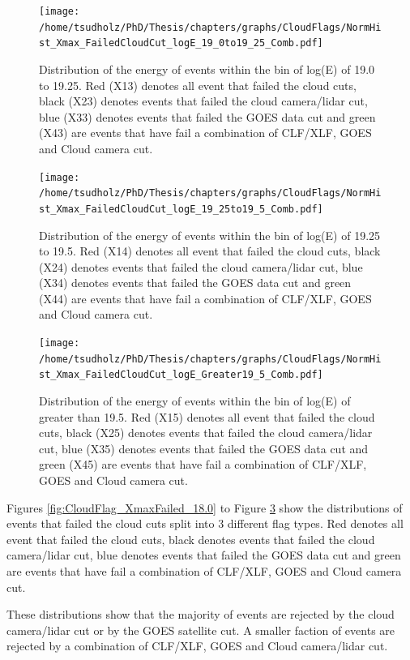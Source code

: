 \begin{figure}[!p]
\centering
\texttt{[image: /home/tsudholz/PhD/Thesis/chapters/graphs/CloudFlags/NormHist\_Xmax\_FailedCloudCut\_logE\_19\_0to19\_25\_Comb.pdf]}
\caption{Distribution of the energy of events within the bin of log(E) of 19.0 to 19.25. Red (X13) denotes all event that failed the cloud cuts, black (X23) denotes events that failed the cloud camera/lidar cut, blue (X33) denotes events that failed the GOES data cut and green (X43) are events that have fail a combination of CLF/XLF, GOES and Cloud camera cut.} \label{fig:CloudFlag_XmaxFailed_19.0}
\end{figure}

\begin{figure}[!p]
\centering
\texttt{[image: /home/tsudholz/PhD/Thesis/chapters/graphs/CloudFlags/NormHist\_Xmax\_FailedCloudCut\_logE\_19\_25to19\_5\_Comb.pdf]}
\caption{Distribution of the energy of events within the bin of log(E) of 19.25 to 19.5. Red (X14) denotes all event that failed the cloud cuts, black (X24) denotes events that failed the cloud camera/lidar cut, blue (X34) denotes events that failed the GOES data cut and green (X44) are events that have fail a combination of CLF/XLF, GOES and Cloud camera cut.} \label{fig:CloudFlag_XmaxFailed_19.25}
\end{figure}

\begin{figure}[!p]
\centering
\texttt{[image: /home/tsudholz/PhD/Thesis/chapters/graphs/CloudFlags/NormHist\_Xmax\_FailedCloudCut\_logE\_Greater19\_5\_Comb.pdf]}
\caption{Distribution of the energy of events within the bin of log(E) of greater than 19.5. Red (X15) denotes all event that failed the cloud cuts, black (X25) denotes events that failed the cloud camera/lidar cut, blue (X35) denotes events that failed the GOES data cut and green (X45) are events that have fail a combination of CLF/XLF, GOES and Cloud camera cut.} \label{fig:CloudFlag_XmaxFailed_19.5}
\end{figure}

Figures \ref{fig:CloudFlag_XmaxFailed_18.0} to Figure \ref{fig:CloudFlag_XmaxFailed_19.5} show the distributions of events that failed the cloud cuts split into 3 different flag types. Red denotes all event that failed the cloud cuts, black denotes events that failed the cloud camera/lidar cut, blue denotes events that failed the GOES data cut and green are events that have fail a combination of CLF/XLF, GOES and Cloud camera cut. 

These distributions show that the majority of events are rejected by the cloud camera/lidar cut or by the GOES satellite cut. A smaller faction of events are rejected by a combination of CLF/XLF, GOES and Cloud camera/lidar cut.

